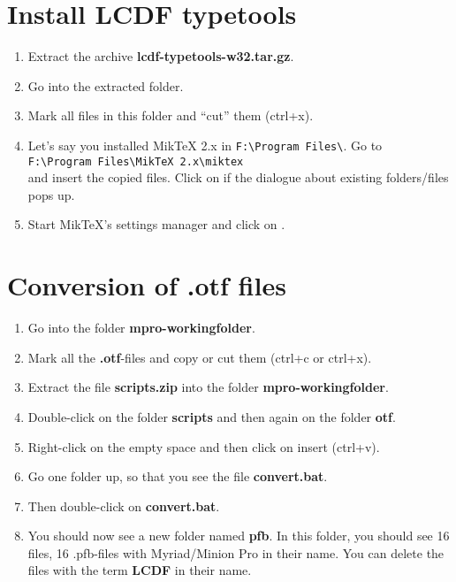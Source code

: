 \section{Install LCDF typetools}

\begin{enumerate}\setlength{\itemsep}{-2pt}
	\item Extract the archive \textbf{lcdf-typetools-w32.tar.gz}.
	\item Go into the extracted folder.
	\item Mark all files in this folder and ``cut'' them (ctrl+x).
	\item Let's say you installed MikTeX 2.x in \verb+F:\Program Files\+. Go to\\
	\verb+F:\Program Files\MikTeX 2.x\miktex+\\
	and insert the copied files. Click on  if the dialogue about existing folders/files pops up.
	\item Start MikTeX's settings manager and click on .
\end{enumerate}

\section{Conversion of .otf files}\label{sec:conversion}

\begin{enumerate}\setlength{\itemsep}{-2pt}
	\item Go into the folder \textbf{mpro-workingfolder}.
	\item Mark all the \textbf{.otf}-files and copy or cut them (ctrl+c or ctrl+x).
	\item Extract the file \textbf{scripts.zip} into the folder \textbf{mpro-workingfolder}.
	\item Double-click on the folder \textbf{scripts} and then again on the folder \textbf{otf}.
	\item Right-click on the empty space and then click on insert (ctrl+v).
	\item Go one folder up, so that you see the file \textbf{convert.bat}.
	\item Then double-click on \textbf{convert.bat}.
	\item You should now see a new folder named \textbf{pfb}. In this folder, you should see 16 files, 16 .pfb-files with Myriad/Minion Pro in their name. You can delete the files with the term \textbf{LCDF} in their name.
\end{enumerate}

